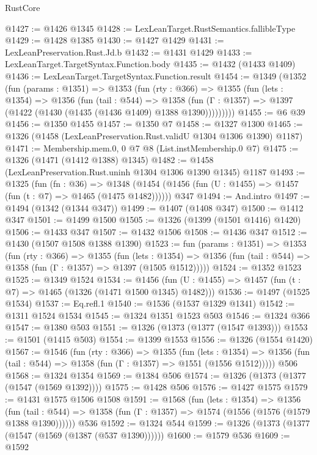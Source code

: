 \begin{lexlean}{RustCore}
\begin{coremodule}
@1427 := @1426 @1345
@1428 := LexLeanTarget.RustSemantics.fallibleType
@1429 := @1428 @1385
@1430 := @1427 @1429
@1431 := LexLeanPreservation.Rust.Jd.b
@1432 := @1431 @1429
@1433 := LexLeanTarget.TargetSyntax.Function.body
@1435 := @1432 (@1433 @1409)
@1436 := LexLeanTarget.TargetSyntax.Function.result
@1454 := @1349
    (@1352
      (fun (params : @1351) =>
      @1353
        (fun (rty : @366) =>
        @1355
          (fun (lets : @1354) =>
          @1356
            (fun (tail : @544) =>
            @1358 (fun (Γ : @1357) => @1397 (@1422 (@1430 (@1435 (@1436 @1409) @1388 @1390)))))))))
@1455 := @6 @39
@1456 := @1350 @1455
@1457 := @1350 @7
@1458 := @1327 @1300
@1465 := @1326 (@1458 (LexLeanPreservation.Rust.validU @1304 @1306 @1390) @1187)
@1471 := Membership.mem.{0, 0} @7 @8 (List.instMembership.{0} @7)
@1475 := @1326 (@1471 (@1412 @1388) @1345)
@1482 := @1458 (LexLeanPreservation.Rust.uninh @1304 @1306 @1390 @1345) @1187
@1493 := @1325
    (fun (fn : @36) =>
    @1348 (@1454 (@1456 (fun (U : @1455) => @1457 (fun (t : @7) => @1465 (@1475 @1482))))))
    @347
@1494 := And.intro
@1497 := @1494 (@1342 (@1344 @347))
@1499 := @1407 (@1408 @347)
@1500 := @1412 @347
@1501 := @1499 @1500
@1505 := @1326 (@1399 (@1501 @1416) @1420)
@1506 := @1433 @347
@1507 := @1432 @1506
@1508 := @1436 @347
@1512 := @1430 (@1507 @1508 @1388 @1390)
@1523 := fun (params : @1351) =>
  @1353
    (fun (rty : @366) =>
    @1355
      (fun (lets : @1354) =>
      @1356 (fun (tail : @544) => @1358 (fun (Γ : @1357) => @1397 (@1505 @1512)))))
@1524 := @1352 @1523
@1525 := @1349 @1524
@1534 := @1456 (fun (U : @1455) => @1457 (fun (t : @7) => @1465 (@1326 (@1471 @1500 @1345) @1482)))
@1536 := @1497 (@1525 @1534)
@1537 := Eq.refl.{1}
@1540 := @1536 (@1537 @1329 @1341)
@1542 := @1311 @1524 @1534
@1545 := @1324 @1351 @1523 @503
@1546 := @1324 @366
@1547 := @1380 @503
@1551 := @1326 (@1373 (@1377 (@1547 @1393)))
@1553 := @1501 (@1415 @503)
@1554 := @1399 @1553
@1556 := @1326 (@1554 @1420)
@1567 := @1546
    (fun (rty : @366) =>
    @1355
      (fun (lets : @1354) =>
      @1356 (fun (tail : @544) => @1358 (fun (Γ : @1357) => @1551 (@1556 @1512)))))
    @506
@1568 := @1324 @1354
@1569 := @1384 @506
@1574 := @1326 (@1373 (@1377 (@1547 (@1569 @1392))))
@1575 := @1428 @506
@1576 := @1427 @1575
@1579 := @1431 @1575 @1506 @1508
@1591 := @1568
    (fun (lets : @1354) =>
    @1356
      (fun (tail : @544) => @1358 (fun (Γ : @1357) => @1574 (@1556 (@1576 (@1579 @1388 @1390))))))
    @536
@1592 := @1324 @544
@1599 := @1326 (@1373 (@1377 (@1547 (@1569 (@1387 (@537 @1390))))))
@1600 := @1579 @536
@1609 := @1592

\end{coremodule}
\end{lexlean}
